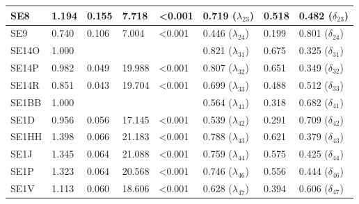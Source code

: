 \documentclass[11pt]{article}
\begin{document}
\begin{table}[h!]
{\begin{tabular}{|l|l|l|l|l|l|l|l|}
SE8               & 1.194            & 0.155                   &  7.718           & \textless 0.001      & 0.719 \hfill ($\lambda_{23}$)  &  0.518               & 0.482 \hfill ($\delta_{23}$)  \\ \hline
SE9               & 0.740            & 0.106                   &  7.004           & \textless 0.001      & 0.446 \hfill ($\lambda_{24}$)  &  0.199               & 0.801 \hfill ($\delta_{24}$)  \\ \hline
%                                                                                                                                
SE14O             & 1.000            &                         &                  &                      & 0.821 \hfill ($\lambda_{31}$)  &  0.675               & 0.325 \hfill ($\delta_{31}$)  \\ \hline
SE14P             & 0.982            & 0.049                   & 19.988           & \textless 0.001      & 0.807 \hfill ($\lambda_{32}$)  &  0.651               & 0.349 \hfill ($\delta_{32}$)  \\ \hline
SE14R             & 0.851            & 0.043                   & 19.704           & \textless 0.001      & 0.699 \hfill ($\lambda_{33}$)  &  0.488               & 0.512 \hfill ($\delta_{33}$)  \\ \hline
%                                                                                                                                
SE1BB             & 1.000            &                         &                  &                      & 0.564 \hfill ($\lambda_{41}$)  &  0.318               & 0.682 \hfill ($\delta_{41}$)  \\ \hline
SE1D              & 0.956            & 0.056                   & 17.145           & \textless 0.001      & 0.539 \hfill ($\lambda_{42}$)  &  0.291               & 0.709 \hfill ($\delta_{42}$)  \\ \hline
SE1HH             & 1.398            & 0.066                   & 21.183           & \textless 0.001      & 0.788 \hfill ($\lambda_{43}$)  &  0.621               & 0.379 \hfill ($\delta_{43}$)  \\ \hline
SE1J              & 1.345            & 0.064                   & 21.088           & \textless 0.001      & 0.759 \hfill ($\lambda_{44}$)  &  0.575               & 0.425 \hfill ($\delta_{44}$)  \\ \hline
SE1P              & 1.323            & 0.064                   & 20.568           & \textless 0.001      & 0.746 \hfill ($\lambda_{46}$)  &  0.556               & 0.444 \hfill ($\delta_{46}$)  \\ \hline
SE1V              & 1.113            & 0.060                   & 18.606           & \textless 0.001      & 0.628 \hfill ($\lambda_{47}$)  &  0.394               & 0.606 \hfill ($\delta_{47}$)  \\ \hline
\end{tabular}                                                                                                                                           
}
\end{table}
\end{document}
